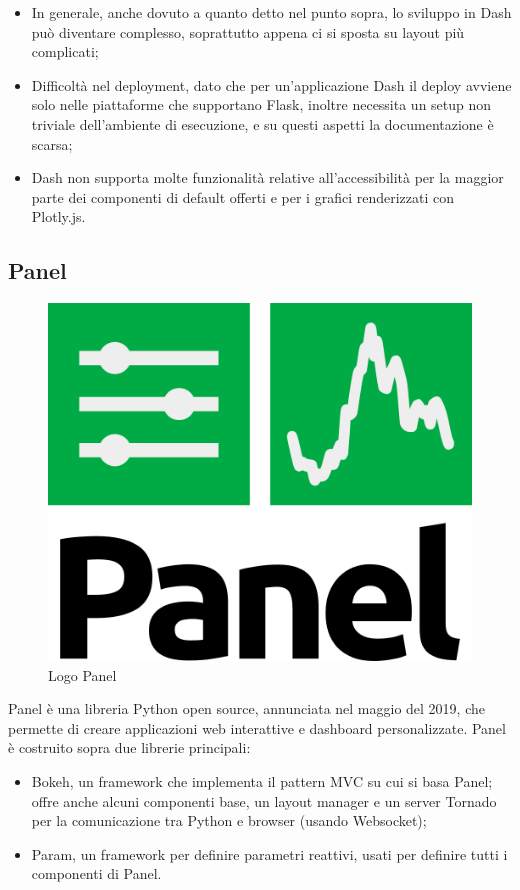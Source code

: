 \begin{itemize}
\item In generale, anche dovuto a quanto detto nel punto sopra, lo sviluppo in Dash può diventare complesso, soprattutto appena ci si sposta su layout più complicati;

\item Difficoltà nel deployment, dato che per un'applicazione Dash il deploy avviene solo nelle piattaforme che supportano Flask, inoltre necessita un setup non triviale dell'ambiente di esecuzione, e su questi aspetti la documentazione è scarsa;

\item Dash non supporta molte funzionalità relative all'accessibilità per la maggior parte dei componenti di default offerti e per i grafici renderizzati con Plotly.js.
	
\end{itemize}

\subsection{Panel}

\begin{figure}[H]
    \centering
    \includegraphics[scale=0.4]{immagini/logo_panel.png}
   \caption{Logo Panel}
\end{figure}


Panel è una libreria Python open source, annunciata nel maggio del 2019, che permette di creare applicazioni web interattive e dashboard personalizzate.
Panel è costruito sopra due librerie principali: 
\begin{itemize}
	\item Bokeh, un framework che implementa il pattern MVC su cui si basa Panel; offre anche alcuni componenti base, un layout manager e un server Tornado per la comunicazione tra Python e browser (usando Websocket);
	
	\item Param, un framework per definire parametri reattivi, usati per definire tutti i componenti di Panel.

\end{itemize}

